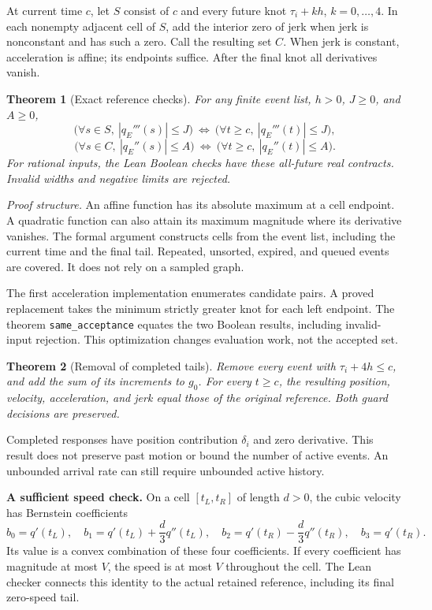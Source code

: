 \documentclass[10pt,letterpaper]{article}
\newtheorem{theorem}{Theorem}
\begin{document}
At current time $c$, let $S$ consist of $c$ and every future knot $\tau_i+kh$,
$k=0,\ldots,4$. In each nonempty adjacent cell of $S$, add the interior zero of
jerk when jerk is nonconstant and has such a zero. Call the resulting set $C$.
When jerk is constant, acceleration is affine; its endpoints suffice. After
the final knot all derivatives vanish.

\begin{theorem}[Exact reference checks]\label{thm:checks}
For any finite event list, $h>0$, $J\geq0$, and $A\geq0$,
\[
 \bigl(\forall s\in S,\ |q_E'''(s)|\leq J\bigr)
 \ \Longleftrightarrow\
 \bigl(\forall t\geq c,\ |q_E'''(t)|\leq J\bigr),
\]
\[
 \bigl(\forall s\in C,\ |q_E''(s)|\leq A\bigr)
 \ \Longleftrightarrow\
 \bigl(\forall t\geq c,\ |q_E''(t)|\leq A\bigr).
\]
For rational inputs, the Lean Boolean checks have these all-future real
contracts. Invalid widths and negative limits are rejected.
\end{theorem}
\textit{Proof structure.} An affine function has its absolute maximum at a cell
endpoint. A quadratic function can also attain its maximum magnitude where its
derivative vanishes. The formal argument constructs cells from the event list,
including the current time and the final tail. Repeated, unsorted, expired, and
queued events are covered. It does not rely on a sampled graph.

The first acceleration implementation enumerates candidate pairs. A proved
replacement takes the minimum strictly greater knot for each left endpoint.
The theorem \texttt{same\_acceptance} equates the two Boolean results, including
invalid-input rejection. This optimization changes evaluation work, not the
accepted set.

\begin{theorem}[Removal of completed tails]\label{thm:prune}
Remove every event with $\tau_i+4h\leq c$, and add the sum of its increments to
$g_0$. For every $t\geq c$, the resulting position, velocity, acceleration, and
jerk equal those of the original reference. Both guard decisions are preserved.
\end{theorem}
Completed responses have position contribution $\delta_i$ and zero derivative.
This result does not preserve past motion or bound the number of active events.
An unbounded arrival rate can still require unbounded active history.

\textbf{A sufficient speed check.}
On a cell $[t_L,t_R]$ of length $d>0$, the cubic velocity has Bernstein
coefficients
\[
 b_0=q'(t_L),\quad b_1=q'(t_L)+\frac d3 q''(t_L),\quad
 b_2=q'(t_R)-\frac d3 q''(t_R),\quad b_3=q'(t_R).
\]
Its value is a convex combination of these four coefficients. If every
coefficient has magnitude at most $V$, the speed is at most $V$ throughout
the cell. The Lean checker connects this identity to the actual retained
reference, including its final zero-speed tail.
\end{document}

